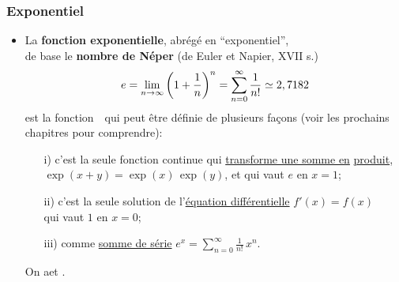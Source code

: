 \documentclass[10pt]{beamer}
\newcommand{\bitem}{\item[$\bullet$]}
\newcommand{\ds}{\displaystyle}
\newcommand{\R}{\mathbb R}
\begin{document}
\begin{frame}
\frametitle{\bf Exponentiel}
\medskip 

\begin{itemize}
\bitem
La {\bf fonction exponentielle}, abr\'eg\'e en ``exponentiel'', \\ 
de base le {\bf nombre de N\'eper} 
{\small (de Euler et Napier, XVII s.)}
\vspace*{-2mm}
$$
e=\lim_{n\rightarrow\infty} \left(1+\frac{1}{n}\right)^n 
= \sum_{n=0}^\infty \frac{1}{n!} \simeq 2,7182
\vspace*{-2mm}
$$
est la fonction\ \ qui peut \^etre d\'efinie 
de plusieurs fa\c{c}ons (voir les prochains chapitres pour comprendre): 
\vspace*{2mm}

\begin{itemize}
\item[i)]
c'est la seule fonction continue qui \underline{transforme une somme en} 
\underline{produit}, $\exp(x+y)=\exp(x)\, \exp(y)$, et qui vaut $e$ en $x=1$;
\vspace*{3mm}

\item[ii)]
c'est la seule solution de l'\underline{\'equation diff\'erentielle}\quad 
$f'(x)=f(x)$ \\ qui vaut $1$ en $x=0$;
\vspace*{3mm}

\item[iii)]
comme \underline{somme de s\'erie}\quad 
$\ds e^x=\sum_{n=0}^\infty \frac{1}{n!}\,x^n$.
\end{itemize}
\vspace*{3mm}

On a\quad \framebox{\ $D_{\exp}=\R$\ }\quad et\quad 
\framebox{\ $I_{\exp}= ]0,\infty[$\ }. 
\end{itemize}

\end{frame}

\end{document}
